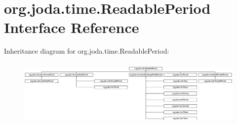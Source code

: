 \hypertarget{interfaceorg_1_1joda_1_1time_1_1_readable_period}{\section{org.\-joda.\-time.\-Readable\-Period Interface Reference}
\label{interfaceorg_1_1joda_1_1time_1_1_readable_period}
}
Inheritance diagram for org.\-joda.\-time.\-Readable\-Period\-:\begin{figure}[H]
\begin{center}
\leavevmode
\includegraphics[height=3.281250cm]{interfaceorg_1_1joda_1_1time_1_1_readable_period}
\end{center}
\end{figure}
